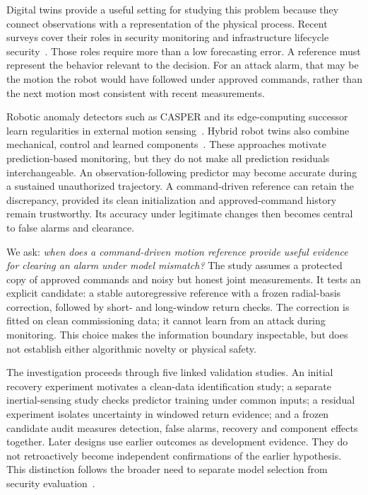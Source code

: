 \documentclass[11pt,twocolumn]{article}
\begin{document}
Digital twins provide a useful setting for studying this problem because they connect observations with a representation of the physical process. Recent surveys cover their roles in security monitoring and infrastructure lifecycle security~\cite{securitysurvey,lifecycle}. Those roles require more than a low forecasting error. A reference must represent the behavior relevant to the decision. For an attack alarm, that may be the motion the robot would have followed under approved commands, rather than the next motion most consistent with recent measurements.

Robotic anomaly detectors such as CASPER and its edge-computing successor learn regularities in external motion sensing~\cite{casper,edge}. Hybrid robot twins also combine mechanical, control and learned components~\cite{hybrid}. These approaches motivate prediction-based monitoring, but they do not make all prediction residuals interchangeable. An observation-following predictor may become accurate during a sustained unauthorized trajectory. A command-driven reference can retain the discrepancy, provided its clean initialization and approved-command history remain trustworthy. Its accuracy under legitimate changes then becomes central to false alarms and clearance.

We ask: \emph{when does a command-driven motion reference provide useful evidence for clearing an alarm under model mismatch?} The study assumes a protected copy of approved commands and noisy but honest joint measurements. It tests an explicit candidate: a stable autoregressive reference with a frozen radial-basis correction, followed by short- and long-window return checks. The correction is fitted on clean commissioning data; it cannot learn from an attack during monitoring. This choice makes the information boundary inspectable, but does not establish either algorithmic novelty or physical safety.

The investigation proceeds through five linked validation studies. An initial recovery experiment motivates a clean-data identification study; a separate inertial-sensing study checks predictor training under common inputs; a residual experiment isolates uncertainty in windowed return evidence; and a frozen candidate audit measures detection, false alarms, recovery and component effects together. Later designs use earlier outcomes as development evidence. They do not retroactively become independent confirmations of the earlier hypothesis. This distinction follows the broader need to separate model selection from security evaluation~\cite{arp}.
\end{document}
